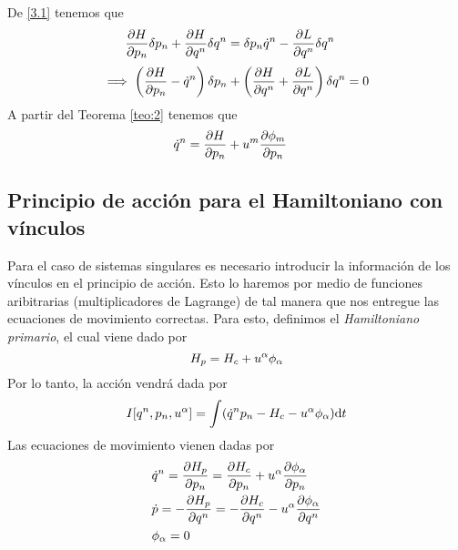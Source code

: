 De \eqref{3.1} tenemos que
\begin{align}
  \pdv{H}{p_n}\delta p_n+\pdv{H}{q^n }\delta q^n &=\delta p_n \dot{q}^n -\pdv{L}{q^n }\delta q^n 
\end{align}
\begin{align}
  \implies \left(\pdv{H}{p_n }-\dot{q}^n \right)\delta p_n +\left(\pdv{H}{q^n}+\pdv{L}{q^n }\right)\delta q^n =0
\end{align}
A partir del Teorema \ref{teo:2} tenemos que
\begin{align}
  \dot{q}^n &=\pdv{H}{p_n }+u^m \pdv{\phi_m}{p_n}
\end{align}

\subsection{Principio de acción para el Hamiltoniano con vínculos}
Para el caso de sistemas singulares es necesario introducir la información de los vínculos en el principio de acción. Esto lo haremos por medio de funciones aribitrarias (multiplicadores de Lagrange) de tal manera que nos entregue las ecuaciones de movimiento correctas. Para esto, definimos el \textit{Hamiltoniano primario}, el cual viene dado por
\begin{equation}
  H_p=H_c+u^\alpha \phi_\alpha 
\end{equation}
Por lo tanto, la acción vendrá dada por
\begin{align}
  I[q^n,p_n,u^\alpha  ]=\int(\dot{q}^n p_n-H_c-u^\alpha \phi_\alpha )\dd t
\end{align}
Las ecuaciones de movimiento vienen dadas por
\begin{equation}
\begin{split}
  &\dot{q}^n =\pdv{H_p}{p_n }=\pdv{H_c}{p_n }+u^\alpha \pdv{\phi_\alpha}{p_n }\\
  &\dot{p}=-\pdv{H_p}{q^n }=-\pdv{H_c}{q^n}-u^\alpha \pdv{\phi_\alpha}{q^n }\\
 &\phi_\alpha =0
\end{split}
\end{equation}

















































